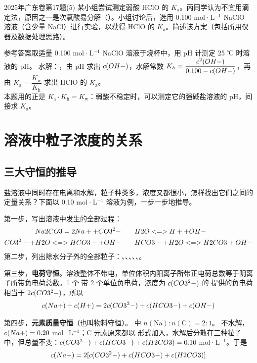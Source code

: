 \begin{zhenti}{2025年广东卷第17题(5)}
某小组尝试测定弱酸 HClO 的 $K_\text{a}$。丙同学认为不宜用滴定法，原因之一是次氯酸易分解（）。小组讨论后，选用 0.100 mol·L$^{-1}$ NaClO 溶液（含少量 NaCl）进行实验，以获得 HClO 的 $K_\text{a}$。简述该方案（包括所用仪器及数据处理思路）。

{\heiti 参考答案}\quad 取适量 0.100 mol·L$^{-1}$ NaClO 溶液于烧杯中，用 pH 计测定 25 ℃ 时溶液的 pH。 水解：，由 pH 求出 $c(OH-)$，水解常数 $K_h=\dfrac{c^2(OH-)}{0.100-c(OH-)}$，再由 $K_\text{a}=\dfrac{K_\text{w}}{K_\text{h}}$ 求出 HClO 的 $K_\text{a}$。\\
\dianbo 本题用的正是 $K_\text{a}\cdot K_\text{h}=K_\text{w}$：弱酸不稳定时，可以测定它的强碱盐溶液的 pH，间接求 $K_\text{a}$。
\end{zhenti}

\section{溶液中粒子浓度的关系}

\subsection{三大守恒的推导}
盐溶液中同时存在电离和水解，粒子种类多，浓度又都很小，怎样找出它们之间的定量关系？下面以 0.10 mol·L$^{-1}$  溶液为例，一步一步地推导。

第一步，写出溶液中发生的全部过程：
\[\begin{aligned}
Na2CO3 = 2Na+ + CO3^2-&\qquad H2O <=> H+ + OH-\\
CO3^2- + H2O <=> HCO3- + OH-&\qquad HCO3- + H2O <=> H2CO3 + OH-
\end{aligned}\]
第二步，列出除水分子外的全部粒子：、、、、、。

第三步，\textbf{电荷守恒}。溶液整体不带电，单位体积内阳离子所带正电荷总数等于阴离子所带负电荷总数。1 个  带 2 个单位负电荷，浓度为 $c(CO3^2-)$ 的  提供的负电荷相当于 $2c(CO3^2-)$，所以
\[c(Na+)+c(H+)=2c(CO3^2-)+c(HCO3-)+c(OH-)\]

第四步，\textbf{元素质量守恒}（也叫物料守恒）。 中 $n(\mathrm{Na}):n(\mathrm{C})=2:1$。 不水解，$c(Na+)=0.20$ mol·L$^{-1}$；C 元素原来都以  形式加入，水解后分散在三种粒子中，但总量不变：$c(CO3^2-)+c(HCO3-)+c(H2CO3)=0.10$ mol·L$^{-1}$。于是
\[c(Na+)=2[c(CO3^2-)+c(HCO3-)+c(H2CO3)]\]

